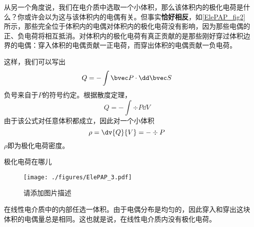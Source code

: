 从另一个角度说，我们在电介质中选取一个小体积，那么该体积内的极化电荷是什么？你或许会以为这与该体积内的电偶有关。但事实\textbf{恰好相反}，如\autoref{ElePAP_fig2} 所示，那些完全位于体积内的电偶对体积内的极化电荷没有影响，因为那些电偶的正、负电荷将相互抵消。对体积内的极化电荷有真正贡献的是那些刚好穿过体积边界的电偶：穿入体积的电偶贡献一正电荷，而穿出体积的电偶贡献一负电荷。

这样，我们可以写出
$$
Q= - \int \bvec P \cdot \dd \bvec S
$$
负号来自于$P$的符号约定。根据散度定理，
$$
Q= - \int \div P \dd V
$$
由于该公式对任意体积都成立，因此对一个小体积
\begin{equation}
\rho = \dv{Q}{V}= - \div P
\end{equation}
$\rho$即为极化电荷密度。

\begin{example}{极化电荷在哪儿}
\begin{figure}[ht]
\centering
\texttt{[image: ./figures/ElePAP\_3.pdf]}
\caption{请添加图片描述} \label{ElePAP_fig3}
\end{figure}
在线性电介质中的内部任选一体积。由于电偶分布是均匀的，因此穿入和穿出这块体积的电偶量总是相同。这也就是说，在线性电介质内没有极化电荷。


\end{example}
